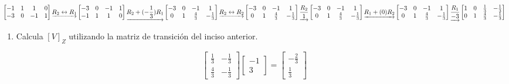 \documentclass[
  11,
]{article}
\providecommand{\tightlist}{%
  \setlength{\itemsep}{0pt}\setlength{\parskip}{0pt}}
\begin{document}
\[
  \left[\begin{matrix}-1 & 1 & 1 & 0\\-3 & 0 & -1 & 1\end{matrix}\right]
\underrightarrow{ R_{2} \leftrightarrow R_{1} }
\left[\begin{matrix}-3 & 0 & -1 & 1\\-1 & 1 & 1 & 0\end{matrix}\right]
\underrightarrow{ R_2 + (- \frac{1}{3})R_1 }
\left[\begin{matrix}-3 & 0 & -1 & 1\\0 & 1 & \frac{4}{3} & - \frac{1}{3}\end{matrix}\right]
\underrightarrow{ R_{2} \leftrightarrow R_{2} }
\left[\begin{matrix}-3 & 0 & -1 & 1\\0 & 1 & \frac{4}{3} & - \frac{1}{3}\end{matrix}\right]
\underrightarrow{ \frac{R_2}{1} }
\left[\begin{matrix}-3 & 0 & -1 & 1\\0 & 1 & \frac{4}{3} & - \frac{1}{3}\end{matrix}\right]
\underrightarrow{ R_1 + (0)R_2 }
\\
\left[\begin{matrix}-3 & 0 & -1 & 1\\0 & 1 & \frac{4}{3} & - \frac{1}{3}\end{matrix}\right]
\underrightarrow{ \frac{R_1}{-3} }
\left[\begin{matrix}1 & 0 & \frac{1}{3} & - \frac{1}{3}\\0 & 1 & \frac{4}{3} & - \frac{1}{3}\end{matrix}\right]
\]

\begin{enumerate}
\def\labelenumi{\alph{enumi})}
\setcounter{enumi}{2}
\tightlist
\item
  Calcula \([V]_Z\) utilizando la matriz de transición del inciso
  anterior.
\end{enumerate}

\[
  \left[\begin{matrix}\frac{1}{3} & - \frac{1}{3}\\\frac{4}{3} & - \frac{1}{3}\end{matrix}\right] \left[\begin{matrix}-1 \\ 3\end{matrix}\right] = \left[\begin{matrix}-\frac{2}{3} \\ \frac{1}{3}\end{matrix}\right]
  \]
\end{document}
